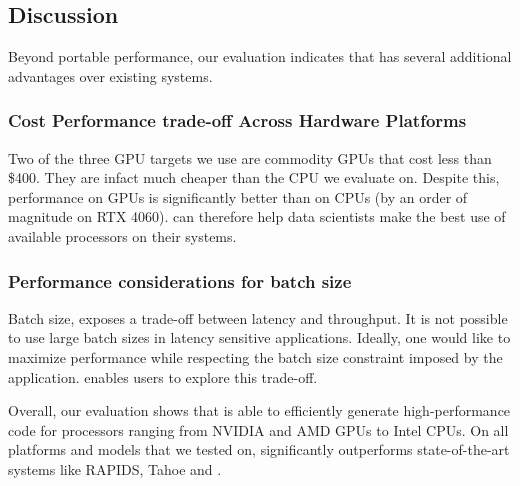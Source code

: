 \subsection{Discussion}
Beyond portable performance, our evaluation indicates that \Treebeard{} has several additional advantages over existing systems.
\subsubsection*{Cost Performance trade-off Across Hardware Platforms}
Two of the three GPU targets we use are commodity GPUs that cost less than \$400. They 
are infact much cheaper than the CPU we evaluate on. Despite this, performance on GPUs
is significantly better than on CPUs (by an order of magnitude on RTX 4060).
\Treebeard{} can therefore help data scientists make the best use of 
available processors on their systems.

\subsubsection*{Performance considerations for batch size}
Batch size, exposes a trade-off between latency and throughput. It is not possible to use 
large batch sizes in latency sensitive applications. 
Ideally, one would like 
to maximize performance while respecting the batch size constraint imposed 
by the application. \Treebeard{} enables users to explore this trade-off.  


\noindent{}
Overall, our evaluation shows that \Treebeard{} is able to efficiently generate 
high-performance code for processors ranging from NVIDIA and AMD GPUs to Intel CPUs.
On all platforms and models that we tested on, \Treebeard{} significantly outperforms
state-of-the-art systems like RAPIDS, Tahoe and \TreebeardOLD{}.